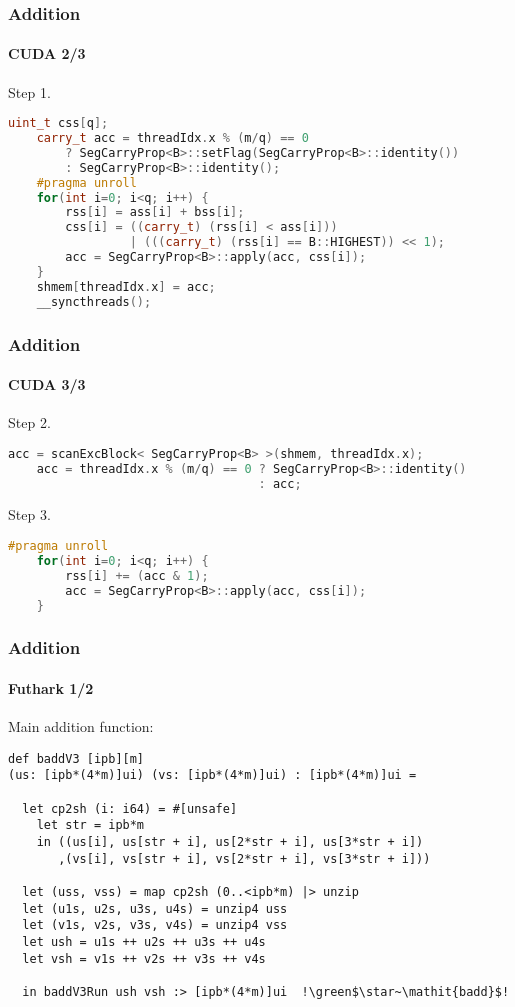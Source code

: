\begin{frame}[fragile]
  \frametitle{Addition}
  \framesubtitle{CUDA 2/3}
  Step 1.
  \begin{lstlisting}[language=CPP,gobble=4,basicstyle=\scriptsize,firstnumber=18,frame=single]
    uint_t css[q];
    carry_t acc = threadIdx.x % (m/q) == 0
        ? SegCarryProp<B>::setFlag(SegCarryProp<B>::identity())
        : SegCarryProp<B>::identity();
    #pragma unroll
    for(int i=0; i<q; i++) {
        rss[i] = ass[i] + bss[i];
        css[i] = ((carry_t) (rss[i] < ass[i]))
                 | (((carry_t) (rss[i] == B::HIGHEST)) << 1);
        acc = SegCarryProp<B>::apply(acc, css[i]);
    }
    shmem[threadIdx.x] = acc;
    __syncthreads();
\end{lstlisting}
\end{frame}

\begin{frame}[fragile]
  \frametitle{Addition}
  \framesubtitle{CUDA 3/3}
  Step 2.
  \begin{lstlisting}[language=CPP,gobble=4,basicstyle=\scriptsize,firstnumber=31,frame=single]
    acc = scanExcBlock< SegCarryProp<B> >(shmem, threadIdx.x);
    acc = threadIdx.x % (m/q) == 0 ? SegCarryProp<B>::identity()
                                   : acc;
\end{lstlisting}
  Step 3.
\begin{lstlisting}[language=CPP,gobble=4,basicstyle=\scriptsize,firstnumber=34,frame=single]
    #pragma unroll
    for(int i=0; i<q; i++) {
        rss[i] += (acc & 1);
        acc = SegCarryProp<B>::apply(acc, css[i]);
    }
\end{lstlisting}
\end{frame}

\begin{frame}[fragile]
  \frametitle{Addition}
  \framesubtitle{Futhark 1/2}
  Main addition function:
\begin{lstlisting}[language=futhark,gobble=0,basicstyle=\scriptsize,escapeinside=!!,frame=single]
def baddV3 [ipb][m]
(us: [ipb*(4*m)]ui) (vs: [ipb*(4*m)]ui) : [ipb*(4*m)]ui =

  let cp2sh (i: i64) = #[unsafe]
    let str = ipb*m
    in ((us[i], us[str + i], us[2*str + i], us[3*str + i])
       ,(vs[i], vs[str + i], vs[2*str + i], vs[3*str + i]))

  let (uss, vss) = map cp2sh (0..<ipb*m) |> unzip
  let (u1s, u2s, u3s, u4s) = unzip4 uss
  let (v1s, v2s, v3s, v4s) = unzip4 vss
  let ush = u1s ++ u2s ++ u3s ++ u4s
  let vsh = v1s ++ v2s ++ v3s ++ v4s

  in baddV3Run ush vsh :> [ipb*(4*m)]ui  !\green$\star~\mathit{badd}$!
\end{lstlisting}
\end{frame}

